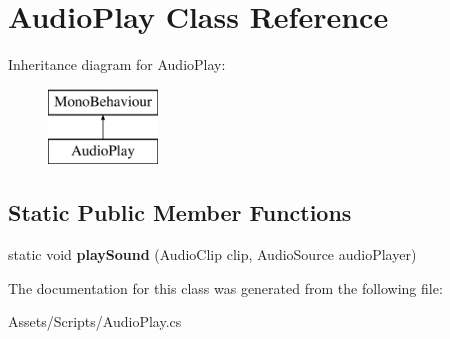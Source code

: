 \hypertarget{class_audio_play}{}\section{Audio\+Play Class Reference}
\label{class_audio_play}
Inheritance diagram for Audio\+Play\+:\begin{figure}[H]
\begin{center}
\leavevmode
\includegraphics[height=2.000000cm]{class_audio_play}
\end{center}
\end{figure}
\subsection*{Static Public Member Functions}
\begin{DoxyCompactItemize}
\item 
static void {\bfseries play\+Sound} (Audio\+Clip clip, Audio\+Source audio\+Player)\hypertarget{class_audio_play_a0b0d431f02a57ceda1883b6687b08c95}{}\label{class_audio_play_a0b0d431f02a57ceda1883b6687b08c95}

\end{DoxyCompactItemize}


The documentation for this class was generated from the following file\+:\begin{DoxyCompactItemize}
\item 
Assets/\+Scripts/Audio\+Play.\+cs\end{DoxyCompactItemize}
